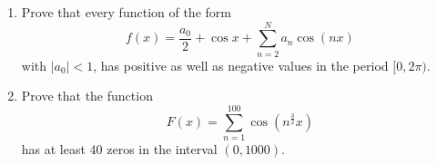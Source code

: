 \documentclass{article}
\begin{document}
	\setlength{\parindent}{0pt}
    \begin{enumerate}[label=\alph*)]
    	\item  Prove that every function of the form
    	$$f(x)=\frac{a_0}{2}+\cos x+\sum_{n=2}^{N}a_n\cos(nx)$$
    	with $|a_0|<1$, has positive as well as negative values in the period $[0,2\pi)$.
    	\item  Prove that the function $$F(x)=\sum_{n=1}^{100}\cos\left(n^{\frac{3}{2}}x\right)$$ has at least 40 zeros in the interval $(0,1000)$.
    \end{enumerate}
\end{document}
